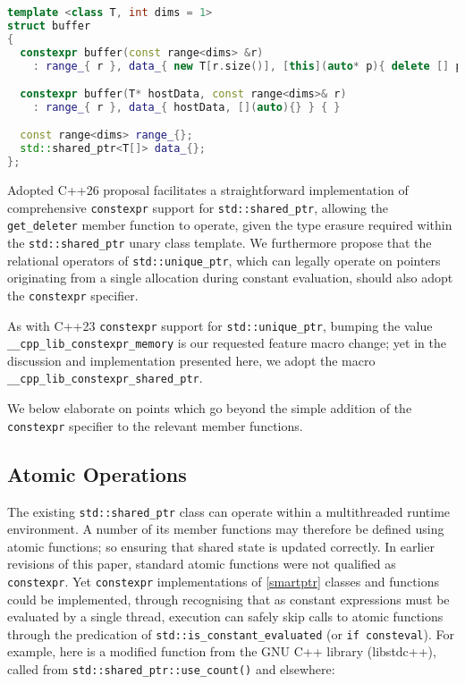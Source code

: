 \documentclass[10pt]{article}
\newcommand*{\wgxxi}[1]{[\href{https://wg21.link/#1}{#1}]}
\begin{document}
\begin{lstlisting}[language=cpp]
template <class T, int dims = 1>
struct buffer
{
  constexpr buffer(const range<dims> &r)
    : range_{ r }, data_{ new T[r.size()], [this](auto* p){ delete [] p; } } { }

  constexpr buffer(T* hostData, const range<dims>& r)
    : range_{ r }, data_{ hostData, [](auto){} } { }

  const range<dims> range_{};
  std::shared_ptr<T[]> data_{};
};
\end{lstlisting}

Adopted C++26 proposal \cite{P2738R1} facilitates a straightforward
implementation of comprehensive \texttt{constexpr} support for
\texttt{std::shared\_ptr}, allowing the \texttt{get\_deleter} member function
to operate, given the type erasure required within the
\texttt{std::shared\_ptr} unary class template. We furthermore propose that the
relational operators of \texttt{std::unique\_ptr}, which can legally operate on
pointers originating from a single allocation during constant evaluation,
should also adopt the \texttt{constexpr} specifier.

As with C++23 \texttt{constexpr} support for \texttt{std::unique\_ptr}, bumping
the value \texttt{\_\_cpp\_lib\_constexpr\_memory} is our requested feature
macro change; yet in the discussion and implementation presented here, we adopt
the macro \texttt{\_\_cpp\_lib\_constexpr\_shared\_ptr}.

We below elaborate on points which go beyond the simple addition of the
\texttt{constexpr} specifier to the relevant member functions.

\subsection{Atomic Operations}

The existing \texttt{std::shared\_ptr} class can operate within a multithreaded
runtime environment. A number of its member functions may therefore be defined
using atomic functions; so ensuring that shared state is updated correctly. In
earlier revisions of this paper, standard atomic functions were not qualified
as \texttt{constexpr}. Yet \texttt{constexpr} implementations of
\wgxxi{smartptr} classes and functions could be implemented, through
recognising that as constant expressions must be evaluated by a single thread,
execution can safely skip calls to atomic functions through the
predication of \texttt{std::is\_constant\_evaluated} (or \texttt{if
consteval}). For example, here is a modified function from the GNU C++ library
(libstdc++), called from \texttt{std::shared\_ptr::use\_count()} and elsewhere:
\end{document}
